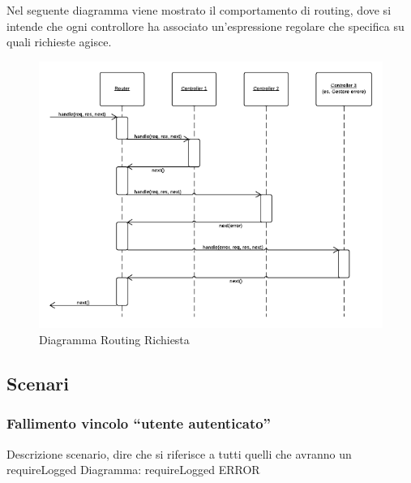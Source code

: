 Nel seguente diagramma viene mostrato il comportamento di routing, dove si intende che ogni controllore ha associato un'espressione regolare che specifica su quali richieste agisce. 
\begin{figure}[H]
	\begin{center} 
		\includegraphics[scale=0.60]{scenari/Diagramma Routing Richiesta.png} 
		\caption{Diagramma Routing Richiesta}
	\end{center} 
\end{figure}

\subsection{Scenari}

\subsubsection{Fallimento vincolo ``utente autenticato''}
Descrizione scenario, dire che si riferisce a tutti quelli che avranno un requireLogged
Diagramma: requireLogged ERROR

